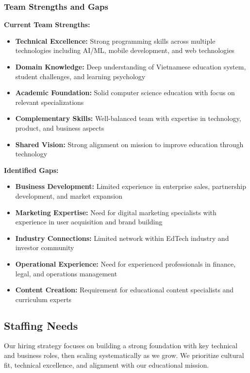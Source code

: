 \subsubsection{Team Strengths and Gaps}
\textbf{Current Team Strengths:}
\begin{itemize}
    \item \textbf{Technical Excellence:} Strong programming skills across multiple technologies including AI/ML, mobile development, and web technologies
    \item \textbf{Domain Knowledge:} Deep understanding of Vietnamese education system, student challenges, and learning psychology
    \item \textbf{Academic Foundation:} Solid computer science education with focus on relevant specializations
    \item \textbf{Complementary Skills:} Well-balanced team with expertise in technology, product, and business aspects
    \item \textbf{Shared Vision:} Strong alignment on mission to improve education through technology
\end{itemize}

\textbf{Identified Gaps:}
\begin{itemize}
    \item \textbf{Business Development:} Limited experience in enterprise sales, partnership development, and market expansion
    \item \textbf{Marketing Expertise:} Need for digital marketing specialists with experience in user acquisition and brand building
    \item \textbf{Industry Connections:} Limited network within EdTech industry and investor community
    \item \textbf{Operational Experience:} Need for experienced professionals in finance, legal, and operations management
    \item \textbf{Content Creation:} Requirement for educational content specialists and curriculum experts
\end{itemize}

\subsection{Staffing Needs}
Our hiring strategy focuses on building a strong foundation with key technical and business roles, then scaling systematically as we grow. We prioritize cultural fit, technical excellence, and alignment with our educational mission.

